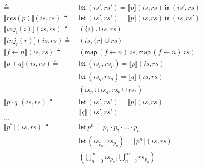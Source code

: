 \documentclass[12pt, letterpaper]{article}
\newcommand\interp[1]{\llbracket #1 \rrbracket}
\begin{document}
\begin{align*}
            \triangleq\ &
            \mathsf{let}\ (\mathit{is}',\mathit{rs}')
            = \interp { p}(\mathit{is}, \mathit{rs})\ 
            \mathsf{in}\ (\mathit{is}',\mathit{rs}) 
            \\
        \interp { res(p) }(\mathit{is}, \mathit{rs})
            \triangleq\ &
            \mathsf{let}\ (\mathit{is}',\mathit{rs}')
            = \interp { p}(\mathit{is}, \mathit{rs})\ 
            \mathsf{in}\ (\mathit{is},\mathit{rs}')
            \\
        \interp { inj_{i}(i) }(\mathit{is}, \mathit{rs})
            \triangleq\ &
            (\{i\} \cup \mathit{is}, \mathit{rs})
            \\
        \interp { inj_{r}(r) }(\mathit{is}, \mathit{rs})
            \triangleq\ &
            (\mathit{is}, \{r\} \cup \mathit{rs})
            \\
        \interp { f \leftarrow n }(\mathit{is}, \mathit{rs})
            \triangleq\ &
            (\mathsf{map}\ (f\leftarrow n)\ \mathit{is},
             \mathsf{map}\ (f\leftarrow n)\ \mathit{rs})
            \\
         \interp { p + q }(\mathit{is}, \mathit{rs})
            \triangleq\ &
            \mathsf{let}\ (\mathit{is}_p,\mathit{rs}_p) =
            \interp { p }(\mathit{is}, \mathit{rs}) 
            \\
            &\mathsf{let}\ (\mathit{is}_q,\mathit{rs}_q) =
            \interp { q }(\mathit{is}, \mathit{rs}) 
            \\
            &(\mathit{is}_p \cup \mathit{is}_q,\mathit{rs}_p \cup \mathit{rs}_b) 
            \\
        \interp { p \cdot q }(\mathit{is}, \mathit{rs})
            \triangleq\ &
            \mathsf{let}\ (\mathit{is}',\mathit{rs}') =
            \interp { p }(\mathit{is}, \mathit{rs})
            \\
            &\interp { q }(\mathit{is}', \mathit{rs}')
            \\
        \dots & \dots \dots \\
        \interp { p ^{*} } (\mathit{is}, \mathit{rs})
            \triangleq\ &
            \mathsf{let}\ p^{n} = p_{1} \cdot p_{2} \cdot \ldots \cdot p_{n}
            \\
            &\mathsf{let}\ (\mathit{is_{p_{n}}}, \mathit{rs_{p_{n}}}) = \interp { p^{n} } (is, rs)
            \\
            &(\bigcup^{\infty}_{n=0} \mathit{is_{p_{n}}}, \bigcup^{\infty}_{n=0} \mathit{rs_{p_{n}}})
            \\
    \end{align*}
\end{document}
